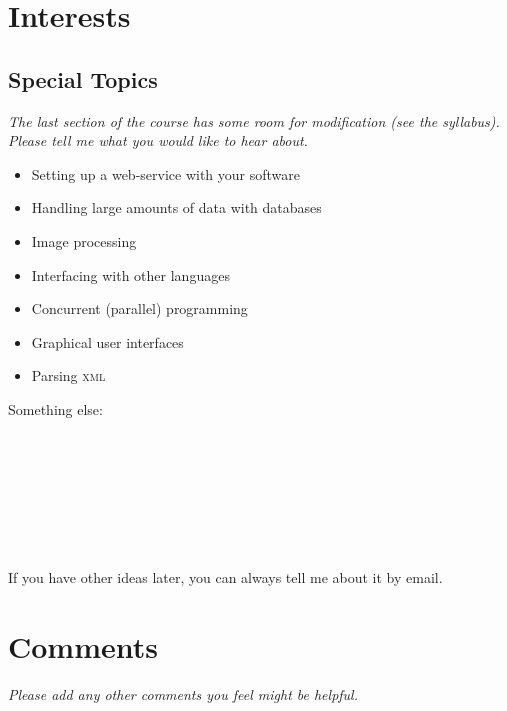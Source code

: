 \documentclass[article,twoside]{memoir}
\newcommand*{\fillunderscore}{~\hrulefill}
\newcommand*{\checkbox}{$\square$}
\newcommand{\header}[1]{\textsl{#1}\par\medskip}
\begin{document}
\chapter{Interests}

\section{Special Topics}

\header{The last section of the course has some room for modification (see the syllabus). Please tell me what you would like to hear about.}

\begin{itemize}[\checkbox]
\item Setting up a web-service with your software
\item Handling large amounts of data with databases
\item Image processing
\item Interfacing with other languages
\item Concurrent (parallel) programming
\item Graphical user interfaces
\item Parsing \textsc{xml}
\end{itemize}

Something else: \fillunderscore\par\smallskip
\fillunderscore\par\smallskip
\fillunderscore\par\smallskip
\fillunderscore\par\smallskip
\fillunderscore

If you have other ideas later, you can always tell me about it by email.

\chapter{Comments}

\header{Please add any other comments you feel might be helpful.}

\fillunderscore\par\smallskip
\fillunderscore\par\smallskip
\fillunderscore\par\smallskip
\fillunderscore\par\smallskip
\fillunderscore\par\smallskip
\fillunderscore\par\smallskip
\fillunderscore\par\smallskip
\fillunderscore\par\smallskip
\fillunderscore\par\smallskip
\fillunderscore\par\smallskip
\fillunderscore\par\smallskip
\fillunderscore\par\smallskip
\fillunderscore\par\smallskip
\fillunderscore\par\smallskip
\fillunderscore\par\smallskip
\fillunderscore
\end{document}
